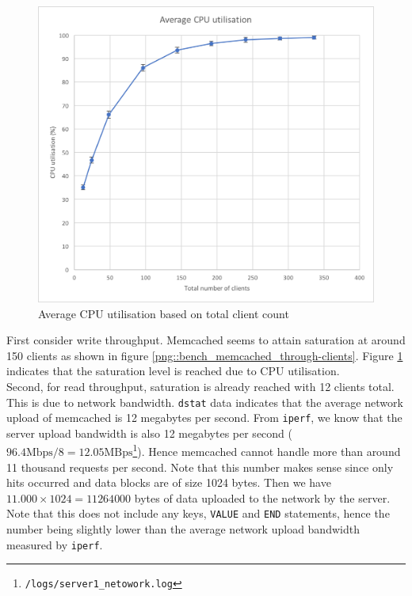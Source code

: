 \documentclass[11pt,a4paper]{article}
\begin{document}
\begin{figure}[!h]
\begin{minipage}[b]{.45\textwidth}
        \includegraphics[width=\textwidth]{processing/graphics/bench_memcached_cpu_util.png}
        \caption{Average CPU utilisation based on total client count}
        \label{png::bench_memcached_cpu_util}
    \end{minipage}
\end{figure}

First consider write throughput. Memcached seems to attain saturation at around 150 clients as shown in figure \ref{png::bench_memcached_through-clients}. Figure \ref{png::bench_memcached_cpu_util} indicates that the saturation level is reached due to CPU utilisation.\\
Second, for read throughput, saturation is already reached with 12 clients total. This is due to network bandwidth. \texttt{dstat} data indicates that the average network upload of memcached is 12 megabytes per second. From \texttt{iperf}, we know that the server upload bandwidth is also 12 megabytes per second ($96.4\text{Mbps}/8=12.05\text{MBps}$\footnote{\label{source::server_net}\texttt{/logs/server1_netowork.log}}). Hence memcached cannot handle more than around 11 thousand requests per second. Note that this number makes sense since only hits occurred and data blocks are of size 1024 bytes. Then we have $11.000 \times 1024 = 11 264 000$ bytes of data uploaded to the network by the server. Note that this does not include any keys, \texttt{VALUE} and \texttt{END} statements, hence the number being slightly lower than the average network upload bandwidth measured by \texttt{iperf}.
\end{document}
